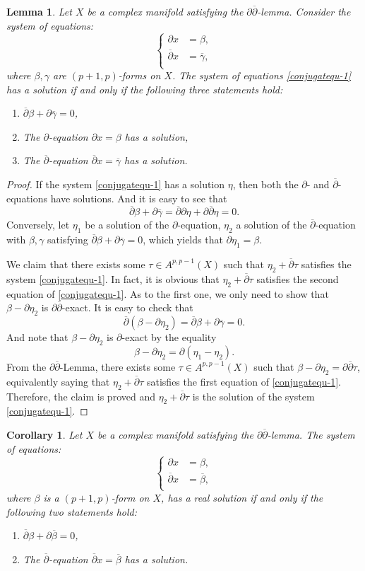 \documentclass[12pt]{amsart}
\numberwithin{equation}{section}
\newtheorem{corollary}  [theorem]     {Corollary}
\newtheorem{lemma}  [theorem]     {Lemma}
\renewcommand{\1}{\mathds{1}}
\newcommand{\db}{\overline{\partial}}
\newcommand{\bcorollary}{\begin{corollary}}
\newcommand{\ecorollary}{\end{corollary}}
\newcommand{\bproof}{\begin{proof}}
\newcommand{\eproof}{\end{proof}}
\newcommand{\beq}{\begin{equation}}
\newcommand{\eeq}{\end{equation}}
\newcommand{\elemma}{\end{lemma}}
\newcommand{\blemma}{\begin{lemma}}
\renewcommand{\>}{\rightarrow}
\newcommand{\p}{\partial}
\newcommand{\bd}{\begin{enumerate} }
\newcommand{\ed}{\end{enumerate}}
\def\p{\partial}
\begin{document}
\blemma\label{slvdb-1} Let $X$ be a complex manifold satisfying the
$\p\db$-lemma. Consider the system of equations:
\beq\label{conjugatequ-1}\left\{
\begin{aligned}
\p x &= \beta, \\
\db x &= \overline{\gamma}, \\
\end{aligned} \right. \eeq
where $\beta,\gamma$ are $(p+1,p)$-forms on $X$. The system of
equations \eqref{conjugatequ-1} has a solution if and only if the
following three statements hold: \bd
\item\label{c-1} $\db \beta + \p\overline{\gamma} = 0$,
\item\label{c-2} The $\p$-equation $\p x = \beta $ has a solution,
\item\label{c-3} The $\db$-equation $\db x = \overline{\gamma}$ has a solution.
\ed \elemma

\bproof If the system \eqref{conjugatequ-1} has a solution $\eta$,
 then both the $\p$- and $\db$-equations have solutions.
And it is easy to see that
\[ \db \beta + \p \overline{\gamma} = \db \p \eta + \p \db \eta = 0.\]
Conversely, let $\eta_1$ be a solution of the $\p$-equation,
$\eta_2$ a solution of the $\db$-equation with $\beta,\gamma$
satisfying $\db \beta + \p \overline{\gamma} = 0$, which yields that
$\p \eta_1 = \beta$.

We claim that there exists some $\tau \in A^{p,p-1}(X)$ such that
$\eta_2 + \db \tau$ satisfies the system \eqref{conjugatequ-1}. In
fact, it is obvious that $\eta_2 + \db \tau$ satisfies the second
equation of \eqref{conjugatequ-1}. As to the first one, we only need
to show that $\beta - \p \eta_2$ is $\p \db$-exact. It is easy to
check that
\[ \db( \beta - \p \eta_2) =\db \beta + \p \overline{\gamma} = 0.\]
And note that $\beta - \p \eta_2$ is $\p$-exact by the equality
\[ \beta - \p \eta_2= \p ( \eta_1 - \eta_2).\]
From the $\p\db$-Lemma, there exists some $\tau \in A^{p,p-1}(X)$
such that $\beta -\p \eta_2 = \p \db \tau$, equivalently saying that
$\eta_2 + \db \tau$ satisfies the first equation of
\eqref{conjugatequ-1}. Therefore, the claim is proved and $\eta_2 +
\db \tau$ is the solution of the system \eqref{conjugatequ-1}.
\eproof

\bcorollary\label{slvdb-2} Let $X$ be a complex manifold satisfying
the $\p\db$-lemma. The system of equations:
\beq\label{conjugatequ-2}\left\{
\begin{aligned}
\p x &= \beta,\\
\db x &= \overline{\beta}, \\
\end{aligned} \right. \eeq
where $\beta$ is a $(p+1,p)$-form on $X$, has a real solution if and
only if the following two statements hold: \bd \item $\db \beta + \p
\overline{\beta} = 0$,
\item The $\db$-equation
$\db x = \overline{\beta}$ has a solution. \ed \ecorollary
\end{document}
